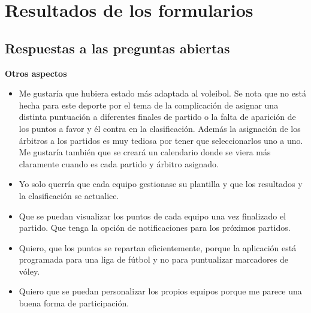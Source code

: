 \chapter{Resultados de los formularios}
\section{Respuestas a las preguntas abiertas}
\textbf{Otros aspectos}
\begin{itemize}
    \item Me gustaría que hubiera estado más adaptada al voleibol. Se nota que no está hecha para este deporte por el tema de la complicación de asignar una distinta puntuación a diferentes finales de partido o la falta de aparición de los puntos a favor y él contra en la clasificación. Además la asignación de los árbitros a los partidos es muy tediosa por tener que seleccionarlos uno a uno. Me gustaría también que se creará un calendario donde se viera más claramente cuando es cada partido y árbitro asignado. \label{list:other_aspects}
    \item Yo solo querría que cada equipo gestionase su plantilla y que los resultados y la clasificación se actualice.
    \item Que se puedan visualizar los puntos de cada equipo una vez finalizado el partido. Que tenga la opción de notificaciones para los próximos partidos.
    \item Quiero, que los puntos se repartan eficientemente, porque la aplicación está programada para una liga de fútbol y no para puntualizar marcadores de vóley.
    \item Quiero que se puedan personalizar los propios equipos porque me parece una buena forma de participación.
\end{itemize}

